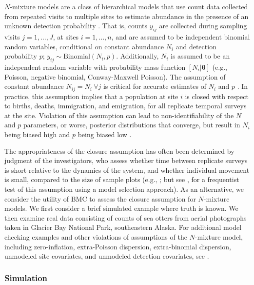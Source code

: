 \documentclass[12pt,english]{article}
\begin{document}
\begin{spacing}{1.9}
$N$-mixture models are a class of hierarchical models that use count
data collected from repeated visits to multiple sites to estimate
abundance in the presence of an unknown detection probability
\citep{Royle2004a}. That is, counts $y_{ij}$ are collected during
sampling visits $j=1,\ldots,J$, at sites $i=1,\ldots,n$, and are
assumed to be independent binomial random variables, conditional on
constant abundance $N_i$ and detection probability $p$;
$y_{ij} \sim \text{Binomial}(N_i,p)$. Additionally, $N_i$ is assumed
to be an independent random variable with probability mass function
$[N_i|\boldsymbol{\theta}]$ (e.g., Poisson, negative binomial,
Conway-Maxwell Poisson).  The assumption of constant abundance
$N_{ij}=N_i~ \forall j$ is critical for accurate estimates of $N_i$
and $p$ \citep{BarkerEtAl2017}. In practice, this assumption implies that a population at
site $i$ is closed with respect to births, deaths, immigration, and
emigration, for all replicate temporal surveys at the site. Violation
of this assumption can lead to non-identifiability of the $N$ and $p$
parameters, or worse, posterior distributions that converge, but
result in $N_i$ being biased high and $p$ being biased low
\citep[Appendix C]{KeryRoyle2016}.

The appropriateness of the closure assumption has often been
determined by judgment of the investigators, who assess whether time
between replicate surveys is short relative to the dynamics of the
system, and whether individual movement is small, compared to the size
of sample plots (e.g., \citealt{efford2012occupancy}; but see
\citealt{DailMadsen2011}, for a frequentist test of this assumption
using a model selection approach). As an alternative, we consider the
utility of BMC to assess the closure assumption
for $N$-mixture models. We first consider a brief simulated example
where truth is known. We then examine real data consisting of counts
of sea otters from aerial photographs taken in Glacier Bay National
Park, southeastern Alaska. For additional model checking examples and
other violations of assumptions of the $N$-mixture model, including
zero-inflation, extra-Poisson dispersion, extra-binomial dispersion,
unmodeled site covariates, and unmodeled detection covariates, see
\citet[][section 6.8]{KeryRoyle2016}.

\subsubsection*{Simulation}


\end{spacing}
\end{document}
